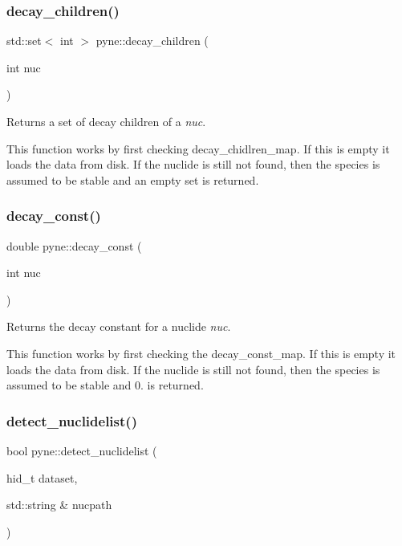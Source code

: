 \subsubsection{\texorpdfstring{decay\+\_\+children()}{decay\_children()}}
{\footnotesize\ttfamily std\+::set$<$ int $>$ pyne\+::decay\+\_\+children (\begin{DoxyParamCaption}\item[{int}]{nuc }\end{DoxyParamCaption})}



Returns a set of decay children of a {\itshape nuc}. 

This function works by first checking decay\+\_\+chidlren\+\_\+map. If this is empty it loads the data from disk. If the nuclide is still not found, then the species is assumed to be stable and an empty set is returned. \mbox{\label{namespacepyne_a6b87e11fea0c2167cd19eb62c21b12b2}} 
\subsubsection{\texorpdfstring{decay\+\_\+const()}{decay\_const()}}
{\footnotesize\ttfamily double pyne\+::decay\+\_\+const (\begin{DoxyParamCaption}\item[{int}]{nuc }\end{DoxyParamCaption})}



Returns the decay constant for a nuclide {\itshape nuc}. 

This function works by first checking the decay\+\_\+const\+\_\+map. If this is empty it loads the data from disk. If the nuclide is still not found, then the species is assumed to be stable and 0. is returned. \mbox{\label{namespacepyne_a6582252a1fea0f1f0f8e1daeccb670b9}} 
\subsubsection{\texorpdfstring{detect\+\_\+nuclidelist()}{detect\_nuclidelist()}}
{\footnotesize\ttfamily bool pyne\+::detect\+\_\+nuclidelist (\begin{DoxyParamCaption}\item[{hid\+\_\+t}]{dataset,  }\item[{std\+::string \&}]{nucpath }\end{DoxyParamCaption})}


